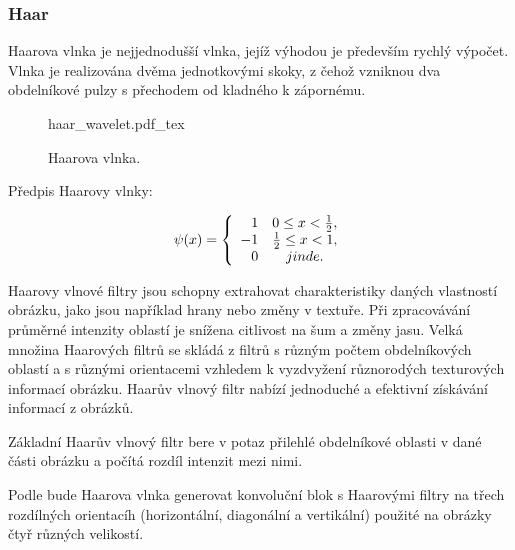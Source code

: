 \documentclass[czech,BP]{thesiskiv}
\begin{document}
\subsubsection{Haar}
\par Haarova vlnka je nejjednodušší vlnka, jejíž výhodou je především rychlý výpočet. Vlnka je realizována dvěma jednotkovými skoky, z čehož vzniknou dva obdelníkové pulzy s přechodem od kladného k zápornému. 

\begin{figure}[H]
    \centering
    \def\svgwidth{200px}
    {haar_wavelet.pdf_tex} 
    \caption{Haarova vlnka.}
\end{figure} 

Předpis Haarovy vlnky:

\begin{displaymath} 
	\label{haar} 
		    \psi(x) = \left\{ \begin{array}{r@{\quad}c}
    		1 & 0 \leq x < \frac{1}{2}, \\
    		-1 & \frac{1}{2} \leq x < 1, \\ 
    		0 & jinde. \\  \end{array} \right. 
\end{displaymath} 
\vspace{1cm}


\par Haarovy vlnové filtry jsou schopny extrahovat charakteristiky daných vlastností obrázku, jako jsou například hrany nebo změny v textuře.  Při zpracovávání průměrné intenzity oblastí je snížena citlivost na šum a změny jasu. Velká množina Haarových filtrů se skládá z filtrů s různým počtem obdelníkových oblastí a s různými orientacemi vzhledem k vyzdvyžení různorodých texturových informací obrázku. Haarův vlnový filtr nabízí jednoduché a efektivní získávání informací z obrázků.
\par Základní Haarův vlnový filtr bere v potaz přilehlé obdelníkové oblasti v dané části obrázku a počítá rozdíl intenzit mezi nimi. 
 
\par Podle \citep{JEC} bude Haarova vlnka generovat konvoluční blok s Haarovými filtry na třech rozdílných orientacíh (horizontální, diagonální a vertikální) použité na obrázky čtyř různých velikostí.  \\
\end{document}
